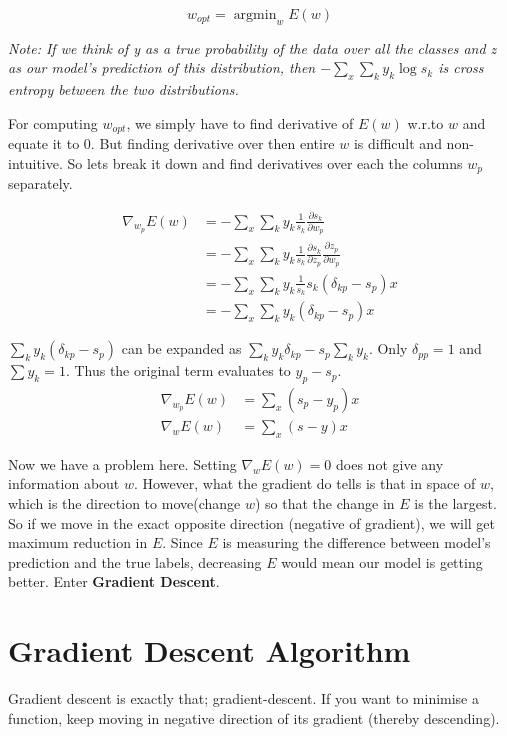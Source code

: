 \documentclass[10pt]{article}
\begin{document}
$$
w_{opt} = \operatorname{argmin}_w  E(w)
$$

\textit{Note:  If we think of y as a true probability of the data over all the classes and z as our model's prediction of this distribution, then $-\sum_x \sum_k y_k \log s_k$ is cross entropy between the two distributions. }



For computing $w_{opt}$, we simply have to find derivative of $E(w)$ w.r.to $w$ and equate it to 0. But finding derivative over then entire $w$ is difficult and non-intuitive. So lets break it down and find derivatives over each the columns $w_p$ separately.


$$
\begin{aligned}
\nabla_{w_p} E(w) &= -\sum_x \sum_k y_k \frac{1}{s_k} \frac{\partial s_k}{\partial w_p}
\\
&=-\sum_x \sum_k y_k \frac{1}{s_k} \frac{\partial s_k}{\partial z_p} \frac{\partial z_p}{\partial w_p} 
\\
&=-\sum_x \sum_k y_k \frac{1}{s_k} s_k(\delta_{kp} - s_p) x
\\
&= -\sum_x \sum_k y_k (\delta_{kp} - s_p) x
\end{aligned}
$$

$\sum_k y_k (\delta_{kp} - s_p)$ can be expanded as $\sum_k y_k \delta_{kp} - s_p\sum_k y_k$. Only $\delta_{pp}=1$ and $\sum y_k =1$. Thus the original term evaluates to $y_p - s_p$.
$$ 
\begin{aligned}
\nabla_{w_p} E(w) &= \sum_x (s_p - y_p) x
\\
\nabla_{w} E(w) &= \sum_x (s - y) x
\end{aligned}
$$

Now we have a problem here. Setting $\nabla_w E(w)=0$ does not give any information about $w$. 
However, what the gradient do tells is that in space of $w$, which is the direction to move(change $w$) so that the change in $E$ is the largest. So if we move in the exact opposite direction (negative of gradient), we will get maximum reduction in $E$. Since $E$ is measuring the difference between model's prediction and the true labels, decreasing $E$ would mean our model is getting better. Enter \textbf{Gradient Descent}.

\section{Gradient Descent Algorithm}
Gradient descent is exactly that; gradient-descent. If you want to minimise a function, keep moving in  negative direction of its gradient (thereby descending).
\end{document}
